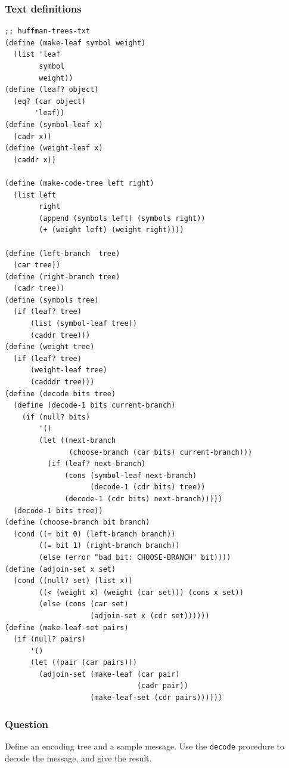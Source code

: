 \documentclass[final,fleqn,titlepage,twoside]{article}
\begin{document}
\subsubsection{Text definitions}
\label{sec:org0e05447}
\begin{verbatim}
;; huffman-trees-txt
(define (make-leaf symbol weight)
  (list 'leaf
        symbol
        weight))
(define (leaf? object)
  (eq? (car object)
       'leaf))
(define (symbol-leaf x)
  (cadr x))
(define (weight-leaf x)
  (caddr x))

(define (make-code-tree left right)
  (list left
        right
        (append (symbols left) (symbols right))
        (+ (weight left) (weight right))))

(define (left-branch  tree)
  (car tree))
(define (right-branch tree)
  (cadr tree))
(define (symbols tree)
  (if (leaf? tree)
      (list (symbol-leaf tree))
      (caddr tree)))
(define (weight tree)
  (if (leaf? tree)
      (weight-leaf tree)
      (cadddr tree)))
(define (decode bits tree)
  (define (decode-1 bits current-branch)
    (if (null? bits)
        '()
        (let ((next-branch
               (choose-branch (car bits) current-branch)))
          (if (leaf? next-branch)
              (cons (symbol-leaf next-branch)
                    (decode-1 (cdr bits) tree))
              (decode-1 (cdr bits) next-branch)))))
  (decode-1 bits tree))
(define (choose-branch bit branch)
  (cond ((= bit 0) (left-branch branch))
        ((= bit 1) (right-branch branch))
        (else (error "bad bit: CHOOSE-BRANCH" bit))))
(define (adjoin-set x set)
  (cond ((null? set) (list x))
        ((< (weight x) (weight (car set))) (cons x set))
        (else (cons (car set)
                    (adjoin-set x (cdr set))))))
(define (make-leaf-set pairs)
  (if (null? pairs)
      '()
      (let ((pair (car pairs)))
        (adjoin-set (make-leaf (car pair)
                               (cadr pair))
                    (make-leaf-set (cdr pairs))))))
\end{verbatim}

\subsubsection{Question}
\label{sec:org61f998d}
Define an encoding tree and a sample message. Use the \texttt{decode}
procedure to decode the message, and give the result.
\end{document}

